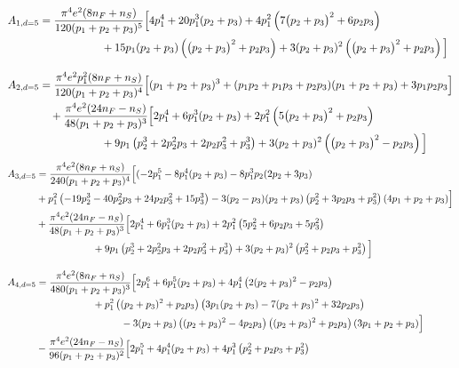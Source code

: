 \documentclass[a4paper,11pt,openright,twoside]{book}
\numberwithin{equation}{section}
\begin{document}
{{\begin{align}
	A_{1,d=5}&=\frac{\pi ^4 e^2 (8 n_F+n_S)}{120 (p_1+p_2+p_3)^5} \Big[4 p_1^4+20 p_1^3 (p_2+p_3)+4 p_1^2 \left(7 \big(p_2+p_3\big)^2+6p_2 p_3\right)\notag\\
	&\hspace{2cm}+15 p_1 (p_2+p_3) \left(\big(p_2+p_3\big)^2+ p_2 p_3\right)+3 (p_2+p_3)^2 \left(\big(p_2+p_3\big)^2+ p_2 p_3\right)\Big]\\[2ex]
	A_{2,d=5}&=\frac{\pi ^4 e^2 p_1^2 (8 n_F+n_S) }{120 (p_1+p_2+p_3)^4}\Big[(p_1+p_2+p_3)^3+(p_1 p_2+p_1 p_3+p_2 p_3) (p_1+p_2+p_3)+3 p_1 p_2 p_3\Big]\notag\\
	&\quad+\frac{\pi ^4 e^2 (24 n_F-n_S)}{48 (p_1+p_2+p_3)^3} \Big[2 p_1^4+6 p_1^3 (p_2+p_3)+2 p_1^2 \left(5 \big(p_2+p_3\big)^2+p_2 p_3\right)\notag\\
	&\hspace{2cm}+9 p_1 \left(p_2^3+2 p_2^2 p_3+2 p_2 p_3^2+p_3^3\right)+3 (p_2+p_3)^2 \left(\big(p_2+p_3\big)^2-p_2 p_3\right)\Big]
\end{align}
\begin{align}
	A_{3,d=5}&=\frac{\pi ^4 e^2 (8 n_F+n_S)}{240 (p_1+p_2+p_3)^4} \Big[(-2 p_1^5-8 p_1^4 (p_2+p_3)-8 p_1^3 p_2 (2 p_2+3 p_3)\notag\\
	&+p_1^2 \left(-19 p_2^3-40 p_2^2 p_3+24 p_2 p_3^2+15 p_3^3\right)-3 (p_2-p_3) (p_2+p_3) \left(p_2^2+3 p_2 p_3+p_3^2\right) (4 p_1+p_2+p_3)\Big]\notag\\
	&+\frac{\pi ^4 e^2 (24 n_F-n_S)}{48 (p_1+p_2+p_3)^3} \Big[2 p_1^4+6 p_1^3 (p_2+p_3)+2 p_1^2 \left(5 p_2^2+6 p_2 p_3+5 p_3^2\right)\notag\\
	&\hspace{2cm}+9 p_1 \left(p_2^3+2 p_2^2 p_3+2 p_2 p_3^2+p_3^3\right)+3 (p_2+p_3)^2 \left(p_2^2+p_2 p_3+p_3^2\right)\Big]
	\\[2ex]
	A_{4,d=5}&=\frac{\pi ^4 e^2 (8 n_F+n_S) }{480 (p_1+p_2+p_3)^3}\Big[2 p_1^6+6 p_1^5 (p_2+p_3)+4 p_1^4 \left(2 (p_2+p_3)^2-p_2 p_3\right)\notag\\
	&\hspace{2cm}+p_1^2 \left((p_2+p_3)^2+p_2 p_3\right) \left(3 p_1 (p_2+p_3)-7 (p_2+p_3)^2+32 p_2 p_3\right)\notag\\
	&\hspace{3cm}-3 (p_2+p_3) \left((p_2+p_3)^2-4 p_2 p_3\right) \left((p_2+p_3)^2+p_2 p_3\right) (3 p_1+p_2+p_3)\Big]\notag\\
	&-\frac{\pi ^4 e^2 (24 n_F-n_S) }{96 (p_1+p_2+p_3)^2}\Big[2 p_1^5+4 p_1^4 (p_2+p_3)+4 p_1^3 \left(p_2^2+p_2 p_3+p_3^2\right)\notag\\

\end{align}}}
\end{document}

